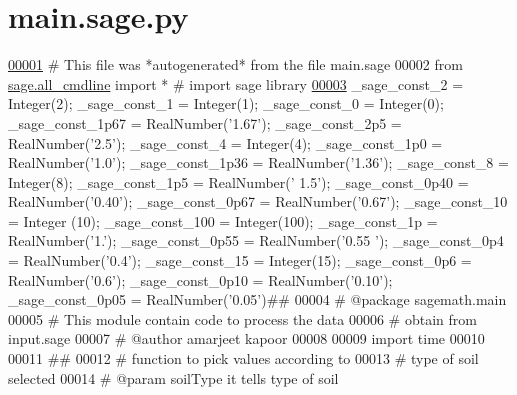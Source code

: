 \hypertarget{main_8sage_8py_source}{}\section{main.\+sage.\+py}
\label{main_8sage_8py_source}

\begin{DoxyCode}
\hypertarget{main_8sage_8py_source_l00001}{}\hyperlink{namespacemain}{00001} \textcolor{comment}{# This file was *autogenerated* from the file main.sage}
00002 \textcolor{keyword}{from} \hyperlink{namespacesage_1_1all__cmdline}{sage.all\_cmdline} \textcolor{keyword}{import} *   \textcolor{comment}{# import sage library}
\hypertarget{main_8sage_8py_source_l00003}{}\hyperlink{namespacemain_ad85d7913c0e40b9e1f30e64611a0fafa}{00003} \_sage\_const\_2 = Integer(2); \_sage\_const\_1 = Integer(1); \_sage\_const\_0 = Integer(0); \_sage\_const\_1p67 = 
      RealNumber(\textcolor{stringliteral}{'1.67'}); \_sage\_const\_2p5 = RealNumber(\textcolor{stringliteral}{'2.5'}); \_sage\_const\_4 = Integer(4); \_sage\_const\_1p0 = 
      RealNumber(\textcolor{stringliteral}{'1.0'}); \_sage\_const\_1p36 = RealNumber(\textcolor{stringliteral}{'1.36'}); \_sage\_const\_8 = Integer(8); \_sage\_const\_1p5 = RealNumber(\textcolor{stringliteral}{'
      1.5'}); \_sage\_const\_0p40 = RealNumber(\textcolor{stringliteral}{'0.40'}); \_sage\_const\_0p67 = RealNumber(\textcolor{stringliteral}{'0.67'}); \_sage\_const\_10 = Integer
      (10); \_sage\_const\_100 = Integer(100); \_sage\_const\_1p = RealNumber(\textcolor{stringliteral}{'1.'}); \_sage\_const\_0p55 = RealNumber(\textcolor{stringliteral}{'0.55
      '}); \_sage\_const\_0p4 = RealNumber(\textcolor{stringliteral}{'0.4'}); \_sage\_const\_15 = Integer(15); \_sage\_const\_0p6 = RealNumber(\textcolor{stringliteral}{'0.6'}); 
      \_sage\_const\_0p10 = RealNumber(\textcolor{stringliteral}{'0.10'}); \_sage\_const\_0p05 = RealNumber(\textcolor{stringliteral}{'0.05'})\textcolor{comment}{##}
00004 \textcolor{comment}{# @package sagemath.main}
00005 \textcolor{comment}{# This module contain code to process the data}
00006 \textcolor{comment}{# obtain from input.sage}
00007 \textcolor{comment}{# @author amarjeet kapoor}
00008 
00009 \textcolor{keyword}{import} time
00010 
00011 \textcolor{comment}{##}
00012 \textcolor{comment}{#  function to pick values according to}
00013 \textcolor{comment}{#  type of soil selected}
00014 \textcolor{comment}{# @param soilType it tells type of soil}

\end{DoxyCode}
